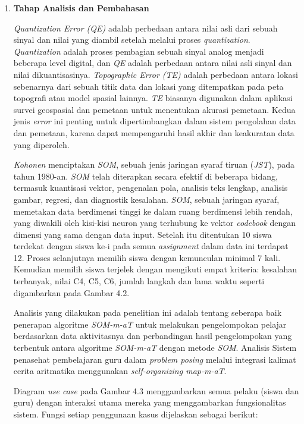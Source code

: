 \begin{enumerate}
    \item \textbf{Tahap Analisis dan Pembahasan}

        \textit{Quantization Error (QE)} adalah perbedaan antara nilai asli dari sebuah sinyal dan nilai yang diambil setelah melalui proses \textit{quantization}. \textit{Quantization} adalah proses pembagian sebuah sinyal analog menjadi beberapa level digital, dan \textit{QE} adalah perbedaan antara nilai asli sinyal dan nilai dikuantisasinya. \textit{Topographic Error (TE)} adalah perbedaan antara lokasi sebenarnya dari sebuah titik data dan lokasi yang ditempatkan pada peta topografi atau model spasial lainnya. \textit{TE} biasanya digunakan dalam aplikasi survei geospasial dan pemetaan untuk menentukan akurasi pemetaan. Kedua jenis \textit{error} ini penting untuk dipertimbangkan dalam sistem pengolahan data dan pemetaan, karena dapat mempengaruhi hasil akhir dan keakuratan data yang diperoleh.

        \textit{Kohonen} menciptakan \textit{SOM}, sebuah jenis jaringan syaraf tiruan (\textit{JST}), pada tahun 1980-an. \textit{SOM} telah diterapkan secara efektif di beberapa bidang, termasuk kuantisasi vektor, pengenalan pola, analisis teks lengkap, analisis gambar, regresi, dan diagnostik kesalahan. \textit{SOM}, sebuah jaringan syaraf, memetakan data berdimensi tinggi ke dalam ruang berdimensi lebih rendah, yang diwakili oleh kisi-kisi neuron yang terhubung ke vektor \textit{codebook} dengan dimensi yang sama dengan data input. Setelah itu ditentukan 10 siswa terdekat dengan siswa ke-i pada semua \textit{assignment} dalam data ini terdapat 12. Proses selanjutnya memilih siswa dengan kemunculan minimal 7 kali. Kemudian memilih siswa terjelek dengan mengikuti empat kriteria: kesalahan terbanyak, nilai C4, C5, C6, jumlah langkah dan lama waktu seperti digambarkan pada Gambar 4.2.

        Analisis yang dilakukan pada penelitian ini adalah tentang seberapa baik penerapan algoritme \textit{SOM-m-aT} untuk melakukan pengelompokan pelajar berdasarkan data aktivitasnya dan perbandingan hasil pengelompokan yang terbentuk antara algoritme \textit{SOM-m-aT} dengan metode \textit{SOM}. Analisis Sistem penasehat pembelajaran guru dalam \textit{problem posing} melalui integrasi kalimat cerita aritmatika menggunakan \textit{self-organizing map-m-aT}.

        Diagram \textit{use case} pada Gambar 4.3 menggambarkan semua pelaku (siswa dan guru) dengan interaksi utama mereka yang menggambarkan fungsionalitas sistem. Fungsi setiap penggunaan kasus dijelaskan sebagai berikut:


\end{enumerate}
